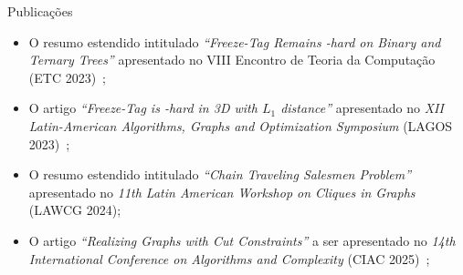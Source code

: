 \begin{frame}{Publicações}
  \begin{itemize}[<+->]
    \item O resumo estendido intitulado \emph{``Freeze-Tag Remains \NP-hard on Binary and Ternary Trees''} apresentado no VIII Encontro de Teoria da Computação (ETC 2023)~\cite{Pe23};

    \item O artigo \emph{``Freeze-Tag is \NP-hard in 3D with $L_1$ distance''} apresentado no \emph{XII Latin-American Algorithms, Graphs and Optimization Symposium} (LAGOS 2023)~\cite{Lu23};

    \item O resumo estendido intitulado \emph{``Chain Traveling Salesmen Problem''} apresentado no \emph{11th Latin American Workshop on Cliques in Graphs} (LAWCG 2024);

    \item O artigo \emph{``Realizing Graphs with Cut Constraints''} a ser apresentado no \emph{14th International Conference on Algorithms and Complexity} (CIAC 2025)~\cite{Silva25};
  \end{itemize}
\end{frame}